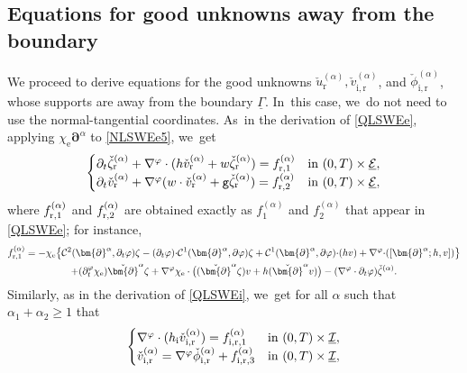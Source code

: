 \documentclass[JEP,XML,SOM,Unicode,NoFloatCountersInSection,published]{cedram}
\newcommand{\gr}{{\mathtt g}}
\newcommand{\dt}{\partial_t}
\newcommand{\cI}{{\mathcal I}}
\newcommand{\cE}{{\mathcal E}}
\newcommand{\ul}[1]{\underline{#1}}
\newcommand{\itGamma}{\mathit{\Gamma}}
\theoremstyle{definition}
\begin{document}
\subsection{Equations for good unknowns away from the boundary}\label{subsect:EqGUb}
We proceed to derive equations for the good unknowns $\check{u}_\mathrm{r}^{(\alpha)},\check{v}_\mathrm{i,r}^{(\alpha)}$, and $\check{\phi}_\mathrm{i,r}^{(\alpha)}$,
whose supports are away from the boundary $\ul{\itGamma}$. In~this case, we~do not need to use the normal-tangential coordinates. As~in the derivation of \eqref{QLSWEe}, applying $\chi_\mathrm{e}\bm{\partial}^\alpha$ to \eqref{NLSWEe5}, we~get
\begin{equation}\label{QLSWEr}
\begin{cases}
\dt\check{\zeta}_\mathrm{r}^{(\alpha)}+\nabla^\varphi\cdot(h\check{v}_\mathrm{r}^{(\alpha)}+w\check{\zeta}_\mathrm{r}^{(\alpha)}) = f_{{\rm r},1}^{(\alpha)}
&\text{in } (0,T)\times\ul{\cE}, \\
\dt\check{v}_\mathrm{r}^{(\alpha)}+\nabla^\varphi(w\cdot\check{v}_\mathrm{r}^{(\alpha)}+\gr\check{\zeta}_\mathrm{r}^{(\alpha)}) = f_{{\rm r},2}^{(\alpha)}
&\text{in } (0,T)\times\ul{\cE},
\end{cases}
\end{equation}
where $f_{{\rm r},1}^{(\alpha)}$ and $f_{{\rm r},2}^{(\alpha)}$ are obtained exactly as $f_{1}^{(\alpha)}$ and $f_{2}^{(\alpha)}$ that appear in \eqref{QLSWEe};
for instance,
\begin{multline*}
f_{{\rm r},1}^{(\alpha)}
= -\chi_\mathrm{e} \big\{ {\mathcal C}^2(\bm{\partial}^\alpha,\dt\varphi)\zeta
- (\dt\varphi){\cdot} {\mathcal C}^1(\bm{\partial}^\alpha,\partial\varphi)\zeta
+{\mathcal C}^1(\bm{\partial}^\alpha,\partial\varphi){\cdot} (hv)+ \nabla^\varphi{\cdot}([\bm{\partial}^\alpha;h,v]) \big\} \\
+ (\dt^\varphi\chi_\mathrm{e}) \check{\bm{\partial}}^\alpha\zeta
+ \nabla^\varphi\chi_\mathrm{e}\cdot\bigl((\check{\bm{\partial}}^\alpha \zeta)v + h (\check{\bm{\partial}}^\alpha v) \bigr)
- (\nabla^\varphi\cdot\dt\varphi)\check{\zeta}^{(\alpha)}.
\end{multline*}
Similarly, as in the derivation of \eqref{QLSWEi}, we~get for all $\alpha$ such that $\alpha_1+\alpha_2\geq 1$ that
\begin{equation}\label{QLSWEir}
\begin{cases}
\nabla^\varphi\cdot(h_\mathrm{i}\check{v}_\mathrm{i,r}^{(\alpha)}) = f_{{\rm i,r},1}^{(\alpha)} &\text{in } (0,T)\times\ul{\cI}, \\
\check{v}_\mathrm{i,r}^{(\alpha)} = \nabla^\varphi\check{\phi}_\mathrm{i,r}^{(\alpha)} + f_{{\rm i,r},3}^{(\alpha)} &\text{in } (0,T)\times\ul{\cI},
\end{cases}
\end{equation}
\end{document}

